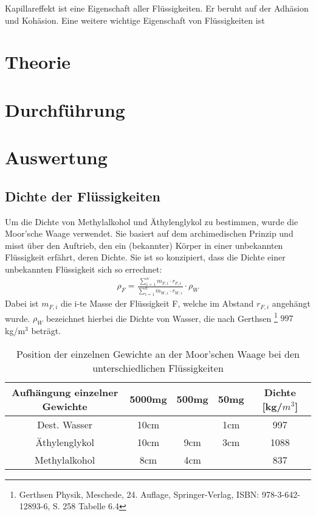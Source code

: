 \documentclass[12pt,a4paper,titlepage,headinclude,bibtotoc]{scrartcl}
\begin{document}
Kapillareffekt ist eine Eigenschaft aller Flüssigkeiten. Er beruht auf der Adhäsion und Kohäsion. Eine weitere wichtige Eigenschaft von Flüssigkeiten ist 

\section{Theorie}
\label{sec:theorie}
                                                                                                                                                                      
\section{Durchführung}
\label{sec:durchfuehrung}

\section{Auswertung}
\label{sec:auswertung}
\subsection{Dichte der Flüssigkeiten}
Um die Dichte von Methylalkohol und Äthylenglykol zu bestimmen, wurde die Moor'sche Waage verwendet.
Sie basiert auf dem archimedischen Prinzip und misst über den Auftrieb, den ein (bekannter) Körper in einer unbekannten Flüssigkeit erfährt, deren Dichte.
Sie ist so konzipiert, dass die Dichte einer unbekannten Flüssigkeit sich so errechnet:
\begin{align}
\rho_F=\frac{\sum\limits_{i=1}^nm_{F,i}\cdot r_{F,i}}{\sum\limits_{i=1}^nm_{W,i}\cdot r_{W,i}}\cdot\rho_W
\end{align}
Dabei ist $m_{F,i}$ die i-te Masse der Flüssigkeit F, welche im Abstand $r_{F,i}$ angehängt wurde.
$\rho_W$ bezeichnet hierbei die Dichte von Wasser, die nach Gerthsen \footnote{Gerthsen Physik, Meschede, 24. Auflage, Springer-Verlag, ISBN: 978-3-642-12893-6, S. 258 Tabelle 6.4} $997$ kg/m$^3$ beträgt.
\begin{table}
\centering
\begin{tabular}{|c|c|c|c|c|}
\hline Aufhängung einzelner Gewichte & 5000mg & 500mg & 50mg &Dichte [kg/$m^3$]\\
\hline Dest. Wasser  & 10cm	&	& 1cm	& 997	\\
\hline Äthylenglykol & 10cm	& 9cm	& 3cm	& 1088	\\
\hline Methylalkohol & 8cm	& 4cm	& 	& 837	\\\hline
\end{tabular}
\caption{Position der einzelnen Gewichte an der Moor'schen Waage bei den unterschiedlichen Flüssigkeiten\label{tab:dichte}}
\end{table}
\end{document}
